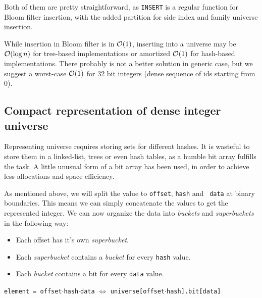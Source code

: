 Both of them are pretty straightforward, as {\tt INSERT} is a regular function
for Bloom filter insertion, with the added partition for side index and family
universe insertion.

While insertion in Bloom filter is in $\mathcal{O}(1)$, inserting into a universe may be
$\mathcal{O}(\log n)$ for tree-based implementations or amortized $\mathcal{O}(1)$ for hash-based
implementations. There probably is not a better solution in generic case,
but we suggest a worst-case $\mathcal{O}(1)$ for 32 bit integers (dense sequence of
ids starting from 0).

\subsection{Compact representation of dense integer universe}

Representing universe requires storing sets for different hashes. It is wasteful
to store them in a linked-list, trees or even hash tables, as a humble bit array
fulfills the task. A little unusual form of a bit array has been used, in order
to achieve less allocations and space efficiency.

As mentioned above, we will split the value to {\tt offset}, {\tt hash} and {\tt
data} at binary boundaries. This means we can simply concatenate the values to
get the represented integer. We can now organize the data into {\it buckets} and
{\it superbuckets} in the following way:

\begin{itemize}
	\item Each offset has it's own {\it superbucket}.
	\item Each {\it superbucket} contains a {\it bucket} for every {\tt hash} value.
	\item Each {\it bucket} contains a bit for every {\tt data} value.
\end{itemize}

\begin{center}
	{\tt element = offset$\cdot$hash$\cdot$data} $\Leftrightarrow$
	{\tt universe[offset$\cdot$hash].bit[data]}
\end{center}

